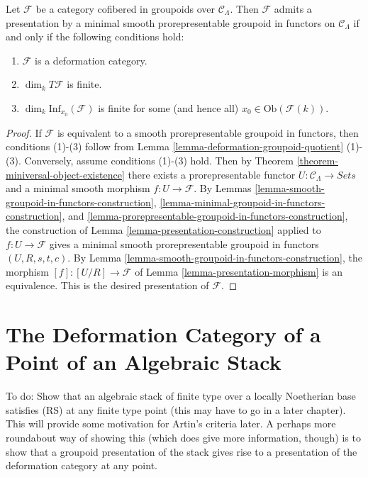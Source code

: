 \begin{theorem}
\label{theorem-presentation-deformation-groupoid}
Let $\mathcal{F}$ be a category cofibered in groupoids over $\mathcal 
C_\Lambda$.  Then $\mathcal{F}$ admits a presentation by a minimal smooth 
prorepresentable groupoid in functors on $\mathcal{C}_\Lambda$ if and only if 
the following conditions hold:
\begin{enumerate}
\item $\mathcal{F}$ is a deformation category.
\item $\dim_k T\mathcal{F}$ is finite.
\item $\dim_k \text{Inf}_{x_0}(\mathcal{F})$ is finite for some (and hence 
all) $x_0 \in \text{Ob}(\mathcal{F}(k))$.
\end{enumerate}
\end{theorem}

\begin{proof}
If $\mathcal{F}$ is equivalent to a smooth prorepresentable groupoid in 
functors, then conditions (1)-(3) follow from Lemma 
\ref{lemma-deformation-groupoid-quotient} (1)-(3).  Conversely, assume 
conditions (1)-(3) hold. Then by Theorem 
\ref{theorem-miniversal-object-existence} there exists a prorepresentable 
functor $U: \mathcal{C}_\Lambda \to \textit{Sets}$ and a minimal 
smooth morphism $f: U \to \mathcal{F}$.  By Lemmas 
\ref{lemma-smooth-groupoid-in-functors-construction}, 
\ref{lemma-minimal-groupoid-in-functors-construction}, and 
\ref{lemma-prorepresentable-groupoid-in-functors-construction}, the 
construction of Lemma \ref{lemma-presentation-construction} applied to $f: U 
\to \mathcal{F}$ gives a minimal smooth prorepresentable groupoid in 
functors $(U,R,s,t,c)$. By Lemma 
\ref{lemma-smooth-groupoid-in-functors-construction}, the morphism $[f]: [U/R] 
\to \mathcal{F}$ of Lemma \ref{lemma-presentation-morphism} is an 
equivalence.  This is the desired presentation of $\mathcal{F}$.
\end{proof}




\section{The Deformation Category of a Point of an Algebraic Stack} 
\label{section-algebraic-stacks}

\noindent
To do: Show that an algebraic stack of finite type over a locally Noetherian
base satisfies (RS) at any finite type point (this may have to go in a later
chapter). This will provide some motivation for Artin's criteria later.
A perhaps more roundabout  way of showing this (which does give more
information, though) is to show that a groupoid presentation of the stack
gives rise to a presentation of the deformation category at any point.





